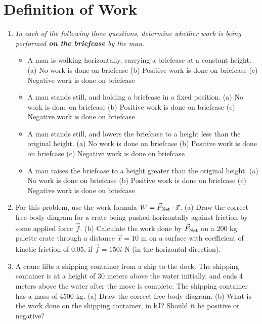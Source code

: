 \documentclass[10pt]{article}
\begin{document}
\maketitle

\section{Definition of Work}
\begin{enumerate}
\item \textit{In each of the following three questions, determine whether work is being performed \textbf{on the briefcase} by the man}.
\begin{itemize}
\item A man is walking horizontally, carrying a briefcase at a constant height. (a) No work is done on briefcase (b) Positive work is done on briefcase (c) Negative work is done on briefcase
\item A man stands still, and holding a briefcase in a fixed position.  (a) No work is done on briefcase (b) Positive work is done on briefcase (c) Negative work is done on briefcase
\item A man stands still, and lowers the briefcase to a height less than the original height.  (a) No work is done on briefcase (b) Positive work is done on briefcase (c) Negative work is done on briefcase
\item A man raises the briefcase to a height greater than the original height.  (a) No work is done on briefcase (b) Positive work is done on briefcase (c) Negative work is done on briefcase
\end{itemize}
\item For this problem, use the work formula $W = \vec{F}_{\rm Net} \cdot \vec{x}$.  (a) Draw the correct free-body diagram for a crate being pushed horizontally against friction by some applied force $\vec{f}$.  (b) Calculate the work done by $\vec{F}_{\rm Net}$ on a 200 kg palette crate through a distance $\vec{x} = 10$ m on a surface with coefficient of kinetic friction of 0.05, if $\vec{f} = 150\hat{i}$ N (in the horizontal direction).  \\ \vspace{2cm}
\item A crane lifts a shipping container from a ship to the dock.  The shipping container is at a height of 30 meters above the water initially, and ends 4 meters above the water after the move is complete.  The shipping container has a mass of 4500 kg.  (a) Draw the correct free-body diagram.  (b) What is the work done on the shipping container, in kJ?  Should it be positive or negative? \\ \vspace{2cm}
\end{enumerate}
\end{document}
